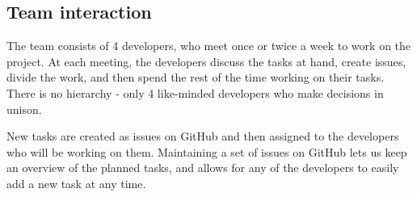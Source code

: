 \subsection{Team interaction}

The team consists of 4 developers, who meet once or twice a week to work on the project. At each meeting, the developers discuss the tasks at hand, create issues, divide the work, and then spend the rest of the time working on their tasks. There is no hierarchy - only 4 like-minded developers who make decisions in unison.

New tasks are created as issues on GitHub and then assigned to the developers who will be working on them. Maintaining a set of issues on GitHub lets us keep an overview of the planned tasks, and allows for any of the developers to easily add a new task at any time.
